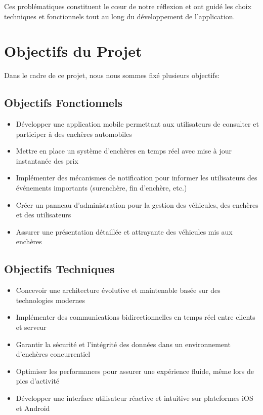 Ces problématiques constituent le cœur de notre réflexion et ont guidé les choix techniques et fonctionnels tout au long du développement de l'application.

\section{Objectifs du Projet}

Dans le cadre de ce projet, nous nous sommes fixé plusieurs objectifs:

\subsection{Objectifs Fonctionnels}

\begin{itemize}
    \item Développer une application mobile permettant aux utilisateurs de consulter et participer à des enchères automobiles
    \item Mettre en place un système d'enchères en temps réel avec mise à jour instantanée des prix
    \item Implémenter des mécanismes de notification pour informer les utilisateurs des événements importants (surenchère, fin d'enchère, etc.)
    \item Créer un panneau d'administration pour la gestion des véhicules, des enchères et des utilisateurs
    \item Assurer une présentation détaillée et attrayante des véhicules mis aux enchères
\end{itemize}

\subsection{Objectifs Techniques}

\begin{itemize}
    \item Concevoir une architecture évolutive et maintenable basée sur des technologies modernes
    \item Implémenter des communications bidirectionnelles en temps réel entre clients et serveur
    \item Garantir la sécurité et l'intégrité des données dans un environnement d'enchères concurrentiel
    \item Optimiser les performances pour assurer une expérience fluide, même lors de pics d'activité
    \item Développer une interface utilisateur réactive et intuitive sur plateformes iOS et Android
\end{itemize}

